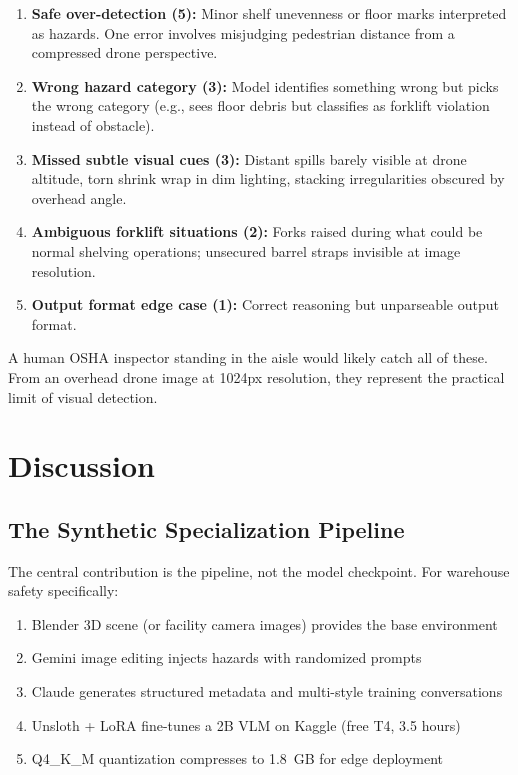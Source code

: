 \documentclass[12pt, a4paper]{article}
\begin{document}
\begin{enumerate}
    \item \textbf{Safe over-detection (5):} Minor shelf unevenness or floor marks interpreted as hazards. One error involves misjudging pedestrian distance from a compressed drone perspective.
    \item \textbf{Wrong hazard category (3):} Model identifies something wrong but picks the wrong category (e.g., sees floor debris but classifies as forklift violation instead of obstacle).
    \item \textbf{Missed subtle visual cues (3):} Distant spills barely visible at drone altitude, torn shrink wrap in dim lighting, stacking irregularities obscured by overhead angle.
    \item \textbf{Ambiguous forklift situations (2):} Forks raised during what could be normal shelving operations; unsecured barrel straps invisible at image resolution.
    \item \textbf{Output format edge case (1):} Correct reasoning but unparseable output format.
\end{enumerate}

A human OSHA inspector standing in the aisle would likely catch all of these. From an overhead drone image at 1024px resolution, they represent the practical limit of visual detection.

\section{Discussion}

\subsection{The Synthetic Specialization Pipeline}

The central contribution is the pipeline, not the model checkpoint. For warehouse safety specifically:

\begin{enumerate}
    \item Blender 3D scene (or facility camera images) provides the base environment
    \item Gemini image editing injects hazards with randomized prompts
    \item Claude generates structured metadata and multi-style training conversations
    \item Unsloth + LoRA fine-tunes a 2B VLM on Kaggle (free T4, 3.5 hours)
    \item Q4\_K\_M quantization compresses to 1.8~GB for edge deployment
\end{enumerate}
\end{document}
